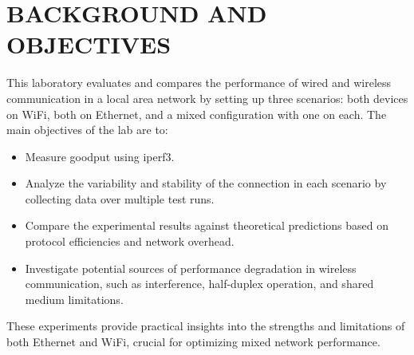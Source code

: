 
\section{BACKGROUND AND OBJECTIVES} \label{sec:background-and-objectives}

    This laboratory evaluates and compares the performance of wired and wireless communication in a local area network by setting up three scenarios: both devices on WiFi, both on Ethernet, and a mixed configuration with one on each.
    The main objectives of the lab are to:

    \begin{itemize}
        \item Measure goodput using iperf3. %
        \item Analyze the variability and stability of the connection in each scenario by collecting data over multiple test runs.
        \item Compare the experimental results against theoretical predictions based on protocol efficiencies and network overhead.
        \item Investigate potential sources of performance degradation in wireless communication, such as interference, half-duplex operation, and shared medium limitations.
    \end{itemize}

    \noindent These experiments provide practical insights into the strengths and limitations of both Ethernet and WiFi, crucial for optimizing mixed network performance.

